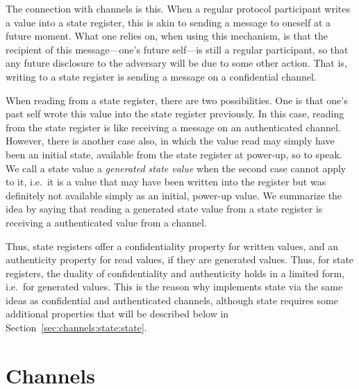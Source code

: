 The connection with channels is this.  When a regular protocol
participant writes a value into a state register, this is akin to
sending a message to oneself at a future moment.  What one relies on,
when using this mechanism, is that the recipient of this
message---one's future self---is still a regular participant, so that
any future disclosure to the adversary will be due to some other
action.  That is, writing to a state register is sending a message on
a confidential channel.

When reading from a state register, there are two possibilities.  One
is that one's past self wrote this value into the state register
previously.  In this case, reading from the state register is like
receiving a message on an authenticated channel.  However, there is
another case also, in which the value read may simply have been an
initial state, available from the state register at power-up, so to
speak.  We call a state value a \emph{generated state value} when the
second case cannot apply to it, i.e.~it is a value that may have been
written into the register but was definitely not available simply as
an initial, power-up value.  We summarize the idea by saying that
reading a generated state value from a state register is receiving a
authenticated value from a channel.

Thus, state registers offer a confidentiality property for written
values, and an authenticity property for read values, if they are
generated values.  Thus, for state registers, the duality of
confidentiality and authenticity holds in a limited form, i.e.~for
generated values.  This is the reason why {\cpsa} implements state via
the same ideas as confidential and authenticated channels, although
state requires some additional properties that will be described below
in Section~\ref{sec:channels:state:state}.

\section{Channels}
\label{sec:channels:state:ch}

